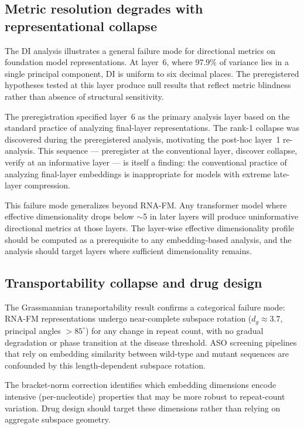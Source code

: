 \documentclass[11pt]{article}
\begin{document}
\subsection{Metric resolution degrades with representational collapse}

The DI analysis illustrates a general failure mode for directional
metrics on foundation model representations. At layer~6, where 97.9\%
of variance lies in a single principal component, DI is uniform to six
decimal places. The preregistered hypotheses tested at this layer
produce null results that reflect metric blindness rather than absence
of structural sensitivity.

The preregistration specified layer~6 as the primary analysis layer
based on the standard practice of analyzing final-layer
representations. The rank-1 collapse was discovered during the
preregistered analysis, motivating the post-hoc layer~1 re-analysis.
This sequence --- preregister at the conventional layer, discover
collapse, verify at an informative layer --- is itself a finding: the
conventional practice of analyzing final-layer embeddings is
inappropriate for models with extreme late-layer compression.

This failure mode generalizes beyond RNA-FM. Any transformer model
where effective dimensionality drops below $\sim$5 in later layers
will produce uninformative directional metrics at those layers. The
layer-wise effective dimensionality profile should be computed as a
prerequisite to any embedding-based analysis, and the analysis should
target layers where sufficient dimensionality remains.

\subsection{Transportability collapse and drug design}

The Grassmannian transportability result confirms a categorical failure
mode: RNA-FM representations undergo near-complete subspace rotation
($d_g \approx 3.7$, principal angles $> 85^\circ$) for any change in
repeat count, with no gradual degradation or phase transition at the
disease threshold. ASO screening pipelines that rely on embedding
similarity between wild-type and mutant sequences are confounded by
this length-dependent subspace rotation.

The bracket-norm correction identifies which embedding dimensions
encode intensive (per-nucleotide) properties that may be more robust
to repeat-count variation. Drug design should target these dimensions
rather than relying on aggregate subspace geometry.
\end{document}
